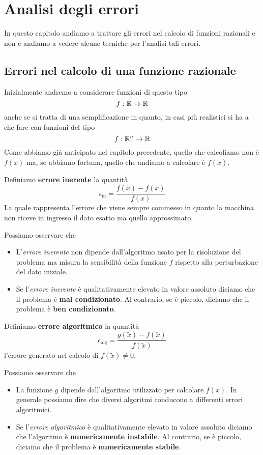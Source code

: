 \chapter{Analisi degli errori}
In questo capitolo andiamo a trattare gli errori nel calcolo di funzioni razionali e non e andiamo a vedere
alcune tecniche per l'analisi tali errori.

\section{Errori nel calcolo di una funzione razionale}
Inizialmente andremo a considerare funzioni di questo tipo
\[ f : \mathbb{R} \to \mathbb{R}\]
anche se si tratta di una semplificazione in quanto, in casi più realistici si ha a che fare con funzioni del tipo
\[ f : \mathbb{R}^n \to \mathbb{R} \]
Come abbiamo già anticipato nel capitolo precedente, quello che calcoliamo non è $f(x)$ ma, se abbiamo fortuna,
quello che andiamo a calcolare è $f(\tilde{x})$.

\begin{definition}
	Definiamo \textbf{errore inerente} la quantità
	\[ \epsilon_{\text{in}} = \frac{f(\tilde{x}) - f(x)}{f(x)} \]
	La quale rappresenta l'errore che viene sempre commesso in quanto la macchina non riceve in ingresso
	il dato esatto ma quello approssimato.
\end{definition}

\begin{observation}
	Possiamo osservare che
	\begin{itemize}
		\item L'\emph{errore inerente} non dipende dall'algoritmo usato per la risoluzione del problema ma
		      misura la sensibilità della funzione $f$ rispetto alla perturbazione del dato iniziale.
		\item Se l'\emph{errore inerente} è qualitativamente elevato in valore assoluto diciamo che il problema
		      è \textbf{mal condizionato}. Al contrario, se è piccolo, diciamo che il problema è
		      \textbf{ben condizionato}.
	\end{itemize}
\end{observation}

\begin{definition}
	Definiamo \textbf{errore algoritmico} la quantità
	\[ \epsilon_{\text{alg}} = \frac{g(\tilde{x}) - f(\tilde{x})}{f(\tilde{x})} \]
	l'errore generato nel calcolo di $f(\tilde{x}) \neq 0$.
\end{definition}

\begin{observation}
	Possiamo osservare che
	\begin{itemize}
		\item La funzione $g$ dipende dall'algoritmo utilizzato per calcolare $f(x)$. In generale possiamo dire
		      che diversi algoritmi conducono a differenti errori algoritmici.
		\item Se l'\emph{errore algoritmico} è qualitativamente elevato in valore assoluto diciamo che l'algoritmo
		      è \textbf{numericamente instabile}. Al contrario, se è piccolo, diciamo che il problema è
		      \textbf{numericamente stabile}.
	\end{itemize}
\end{observation}


